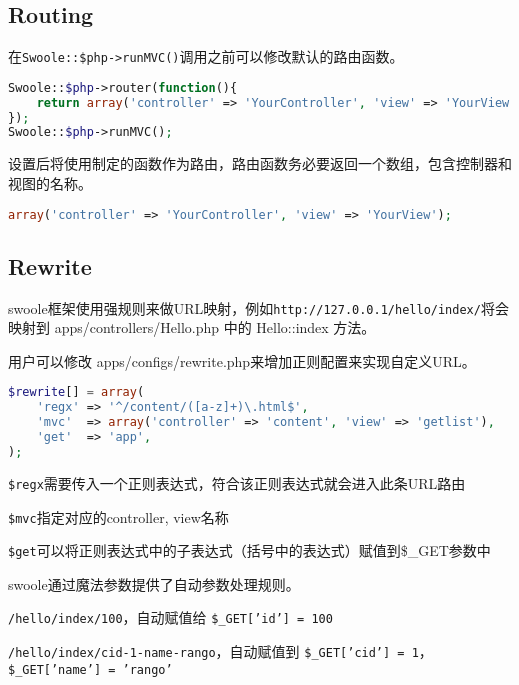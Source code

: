 \subsection{Routing}


在\texttt{Swoole::\$php->runMVC()}调用之前可以修改默认的路由函数。


\begin{lstlisting}[language=PHP]
Swoole::$php->router(function(){
    return array('controller' => 'YourController', 'view' => 'YourView');
});
Swoole::$php->runMVC();
\end{lstlisting}

设置后将使用制定的函数作为路由，路由函数务必要返回一个数组，包含控制器和视图的名称。

\begin{lstlisting}[language=PHP]
array('controller' => 'YourController', 'view' => 'YourView');
\end{lstlisting}



\subsection{Rewrite}


swoole框架使用强规则来做URL映射，例如\texttt{http://127.0.0.1/hello/index/}将会映射到 apps/controllers/Hello.php 中的 Hello::index 方法。

用户可以修改 apps/configs/rewrite.php来增加正则配置来实现自定义URL。





\begin{lstlisting}[language=PHP]
$rewrite[] = array(
    'regx' => '^/content/([a-z]+)\.html$',
    'mvc'  => array('controller' => 'content', 'view' => 'getlist'),
    'get'  => 'app',
);
\end{lstlisting}

\begin{compactitem}
\item \texttt{\$regx}需要传入一个正则表达式，符合该正则表达式就会进入此条URL路由
\item \texttt{\$mvc}指定对应的controller, view名称
\item \texttt{\$get}可以将正则表达式中的子表达式（括号中的表达式）赋值到\$\_GET参数中
\end{compactitem}

swoole通过魔法参数提供了自动参数处理规则。

\begin{compactitem}
\item \texttt{/hello/index/100}，自动赋值给 \texttt{\$\_GET['id'] = 100}
\item \texttt{/hello/index/cid-1-name-rango}，自动赋值到 \texttt{\$\_GET['cid'] = 1}， \texttt{\$\_GET['name'] = 'rango'}
\end{compactitem}

